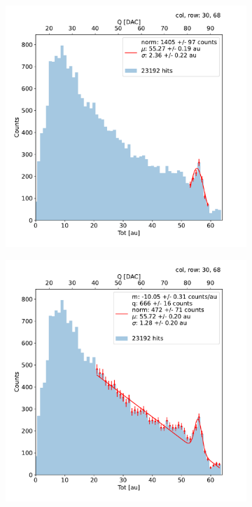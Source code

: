         \begin{figure}
            \centering
            \begin{subfigure}[b]{0.49\textwidth}
                \centering
                \includegraphics[width=\linewidth]{figures/charaterization/fit_gauss_r69.pdf}
                \caption{}
                \label{fig:gauss_c68}
            \end{subfigure}
            \hfill
            \begin{subfigure}[b]{0.49\textwidth}
                \centering
                \includegraphics[width=\linewidth]{figures/charaterization/fit_line_gauss_r69.pdf}

\end{subfigure}
\end{figure}
